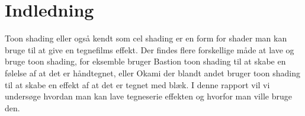 \section*{Indledning}
\thispagestyle{empty}
Toon shading eller også kendt som cel shading er en form for shader man kan bruge til at give en tegnefilms effekt. Der findes flere forskellige måde at lave og bruge toon shading, for eksemble bruger Bastion toon shading til at skabe en følelse af at det er håndtegnet, eller Okami der blandt andet bruger toon shading til at skabe en effekt af at det er tegnet med blæk. I denne rapport vil vi undersøge hvordan man kan lave tegneserie effekten og hvorfor man ville bruge den.